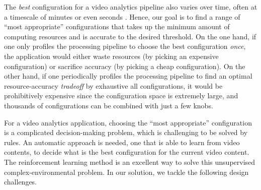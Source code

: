 The \emph{best} configuration for a video analytics pipeline also varies over time, often at a timescale of minutes or even seconds \cite{jiang2018chameleon}. Hence, our goal is to find a range of ``most appropriate'' configurations that takes up the minimum amount of computing resources and is accurate to the desired threshold. On the one hand, if one only profiles the processing pipeline to choose the best configuration \emph{once}, the application would either waste resources (by picking an expensive configuration) or sacrifice accuracy (by picking a cheap configuration). On the other hand, if one periodically profiles the processing pipeline to find an optimal resource-accuracy \emph{tradeoff} by exhaustive all configurations, it would be prohibitively expensive since the configuration space is extremely large, and thousands of configurations can be combined with just a few knobs.


For a video analytics application, choosing the ``most appropriate'' configuration is a complicated decision-making problem, which is challenging to be solved by rules. An automatic approach is needed, one that is able to learn from video contents, to decide what is the best configuration for the current video content. The reinforcement learning method is an excellent way to solve this unsupervised complex-environmental problem. In our solution, we tackle the following design challenges.



